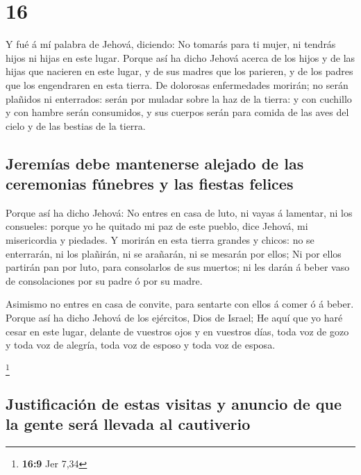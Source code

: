 \hypertarget{section-15}{%
\section{16}\label{section-15}}

 Y fué á mí palabra de Jehová, diciendo:  No
tomarás para ti mujer, ni tendrás hijos ni hijas en este lugar.
 Porque así ha dicho Jehová acerca de los hijos y de las
hijas que nacieren en este lugar, y de sus madres que los parieren, y de
los padres que los engendraren en esta tierra.  De
dolorosas enfermedades morirán; no serán plañidos ni enterrados: serán
por muladar sobre la haz de la tierra: y con cuchillo y con hambre serán
consumidos, y sus cuerpos serán para comida de las aves del cielo y de
las bestias de la tierra.

\hypertarget{jeremuxedas-debe-mantenerse-alejado-de-las-ceremonias-fuxfanebres-y-las-fiestas-felices}{%
\subsection{Jeremías debe mantenerse alejado de las ceremonias fúnebres
y las fiestas
felices}\label{jeremuxedas-debe-mantenerse-alejado-de-las-ceremonias-fuxfanebres-y-las-fiestas-felices}}

 Porque así ha dicho Jehová: No entres en casa de luto, ni
vayas á lamentar, ni los consueles: porque yo he quitado mi paz de este
pueblo, dice Jehová, mi misericordia y piedades.  Y
morirán en esta tierra grandes y chicos: no se enterrarán, ni los
plañirán, ni se arañarán, ni se mesarán por ellos;  Ni por
ellos partirán pan por luto, para consolarlos de sus muertos; ni les
darán á beber vaso de consolaciones por su padre ó por su madre.

 Asimismo no entres en casa de convite, para sentarte con
ellos á comer ó á beber.  Porque así ha dicho Jehová de
los ejércitos, Dios de Israel; He aquí que yo haré cesar en este lugar,
delante de vuestros ojos y en vuestros días, toda voz de gozo y toda voz
de alegría, toda voz de esposo y toda voz de esposa.

\footnote{\textbf{16:9} Jer 7,34}

\hypertarget{justificaciuxf3n-de-estas-visitas-y-anuncio-de-que-la-gente-seruxe1-llevada-al-cautiverio}{%
\subsection{Justificación de estas visitas y anuncio de que la gente
será llevada al
cautiverio}\label{justificaciuxf3n-de-estas-visitas-y-anuncio-de-que-la-gente-seruxe1-llevada-al-cautiverio}}

